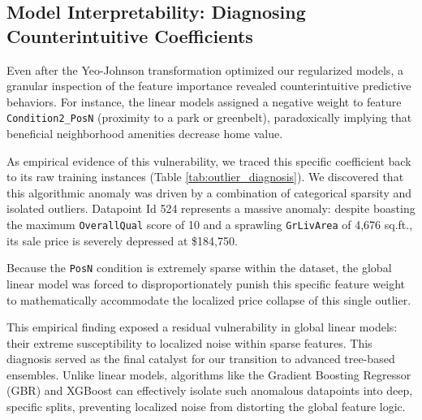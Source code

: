 \documentclass{article}
\begin{document}
\subsection{Model Interpretability: Diagnosing Counterintuitive Coefficients}

Even after the Yeo-Johnson transformation optimized our regularized models, a granular inspection of the feature importance revealed counterintuitive predictive behaviors. For instance, the linear models assigned a negative weight to feature \texttt{Condition2\_PosN} (proximity to a park or greenbelt), paradoxically implying that beneficial neighborhood amenities decrease home value.

As empirical evidence of this vulnerability, we traced this specific coefficient back to its raw training instances (Table \ref{tab:outlier_diagnosis}). We discovered that this algorithmic anomaly was driven by a combination of categorical sparsity and isolated outliers. Datapoint Id 524 represents a massive anomaly: despite boasting the maximum \texttt{OverallQual} score of 10 and a sprawling \texttt{GrLivArea} of 4,676 sq.ft., its sale price is severely depressed at \$184,750. 

\begin{table}[H]
\centering
\caption{Diagnosis of Outlier-Induced Weight Distortion}
\label{tab:outlier_diagnosis}
\end{table}

Because the \texttt{PosN} condition is extremely sparse within the dataset, the global linear model was forced to disproportionately punish this specific feature weight to mathematically accommodate the localized price collapse of this single outlier. 

This empirical finding exposed a residual vulnerability in global linear models: their extreme susceptibility to localized noise within sparse features. This diagnosis served as the final catalyst for our transition to advanced tree-based ensembles. Unlike linear models, algorithms like the Gradient Boosting Regressor (GBR) and XGBoost can effectively isolate such anomalous datapoints into deep, specific splits, preventing localized noise from distorting the global feature logic.
\end{document}
